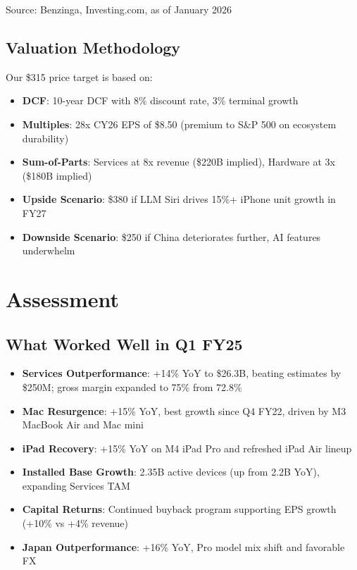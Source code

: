 \documentclass[11pt,a4paper]{article}
\begin{document}
\vspace{6pt}
\textcolor{msgray}{\scriptsize Source: Benzinga, Investing.com, as of January 2026}

\subsection{Valuation Methodology}

Our \$315 price target is based on:

\begin{itemize}
    \item \textbf{DCF}: 10-year DCF with 8\% discount rate, 3\% terminal growth
    \item \textbf{Multiples}: 28x CY26 EPS of \$8.50 (premium to S\&P 500 on ecosystem durability)
    \item \textbf{Sum-of-Parts}: Services at 8x revenue (\$220B implied), Hardware at 3x (\$180B implied)
    \item \textbf{Upside Scenario}: \$380 if LLM Siri drives 15\%+ iPhone unit growth in FY27
    \item \textbf{Downside Scenario}: \$250 if China deteriorates further, AI features underwhelm
\end{itemize}

\section{Assessment}

\subsection{What Worked Well in Q1 FY25}

\begin{itemize}
    \item \textbf{Services Outperformance}: +14\% YoY to \$26.3B, beating estimates by \$250M; gross margin expanded to 75\% from 72.8\%
    \item \textbf{Mac Resurgence}: +15\% YoY, best growth since Q4 FY22, driven by M3 MacBook Air and Mac mini
    \item \textbf{iPad Recovery}: +15\% YoY on M4 iPad Pro and refreshed iPad Air lineup
    \item \textbf{Installed Base Growth}: 2.35B active devices (up from 2.2B YoY), expanding Services TAM
    \item \textbf{Capital Returns}: Continued buyback program supporting EPS growth (+10\% vs +4\% revenue)
    \item \textbf{Japan Outperformance}: +16\% YoY, Pro model mix shift and favorable FX
\end{itemize}
\end{document}
